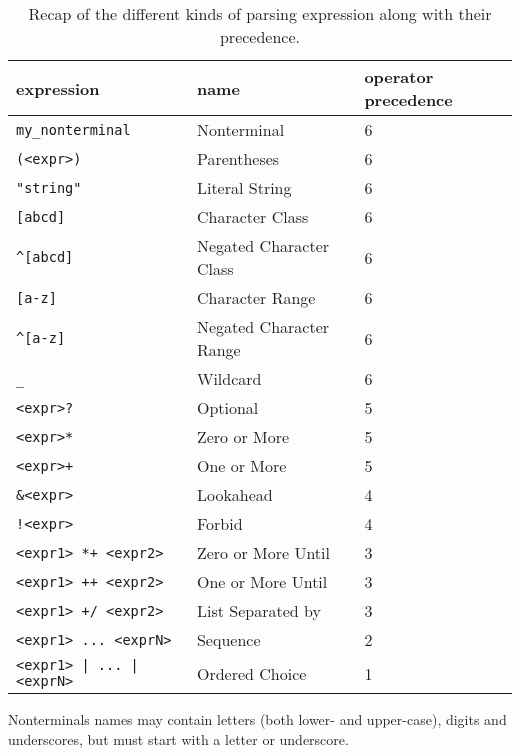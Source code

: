 \begin{table}[here]
\begin{tabular}{|l|l|l|}
\hline
expression & name & operator precedence \\
\hline
\verb|my_nonterminal|             & Nonterminal               & 6 \\
\verb|(<expr>)|                   & Parentheses               & 6 \\
\verb|"string"|                   & Literal String            & 6 \\
\verb|[abcd]|                     & Character Class           & 6 \\
\verb|^[abcd]|                    & Negated Character Class   & 6 \\
\verb|[a-z]|                      & Character Range           & 6 \\
\verb|^[a-z]|                     & Negated Character Range   & 6 \\
\verb|_|                          & Wildcard                  & 6 \\
\verb|<expr>?|                    & Optional                  & 5 \\
\verb|<expr>*|                    & Zero or More              & 5 \\
\verb|<expr>+|                    & One or More               & 5 \\
\verb|&<expr>|                    & Lookahead                 & 4 \\
\verb|!<expr>|                    & Forbid                    & 4 \\
\verb|<expr1> *+ <expr2>|         & Zero or More Until        & 3 \\
\verb|<expr1> ++ <expr2>|         & One or More Until         & 3 \\
\verb|<expr1> +/ <expr2>|         & List Separated by         & 3 \\
\verb|<expr1> ... <exprN>|        & Sequence                  & 2 \\
\verb/<expr1> | ... | <exprN>/    & Ordered Choice            & 1 \\
\hline
\end{tabular}
\caption{  Recap of the different kinds of parsing expression along with their
  precedence.}
\label{parsing_exprs}
\end{table}

Nonterminals names may contain letters (both lower- and upper-case), digits and
underscores, but must start with a letter or underscore.

